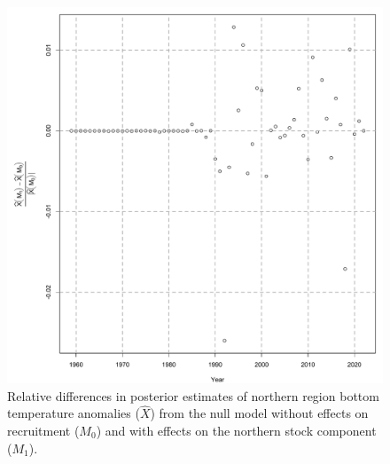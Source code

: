 \documentclass[
]{article}
\begin{document}
\begin{figure}

{\centering \includegraphics[height=0.95\textheight]{Ecov_M1_rel_M0} 

}

\caption{Relative differences in posterior estimates of northern region bottom temperature anomalies ($\widehat X$) from the null model without effects on recruitment ($M_0$) and with effects on the northern stock component ($M_1$).}\label{fig:Ecov-M1-rel-M0}
\end{figure}
\end{document}
